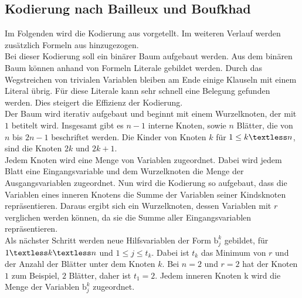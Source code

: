 \documentclass[a4,abstract=on]{scrartcl}
\begin{document}
	\subsection{Kodierung nach Bailleux und Boufkhad}
Im Folgenden wird die Kodierung aus \cite[][]{bailleux} vorgetellt. Im weiteren Verlauf werden zusätzlich Formeln aus \cite[][]{knuth} hinzugezogen.\\
Bei dieser Kodierung soll ein binärer Baum aufgebaut werden. Aus dem binären Baum können anhand von Formeln Literale gebildet werden. Durch das Wegstreichen von trivialen Variablen bleiben am Ende einige Klauseln mit einem Literal übrig. Für diese Literale kann sehr schnell eine Belegung gefunden werden. Dies steigert die Effizienz der Kodierung.\\
Der Baum wird iterativ aufgebaut und beginnt mit einem Wurzelknoten, der mit $1$ betitelt wird. Insgesamt gibt es $n-1$ interne Knoten, sowie $n$ Blätter, die von $n$ bis $2n-1$ beschriftet werden. Die Kinder von Knoten $k$  für $1 \leq k \textless n$, sind die Knoten $2k$ und $2k +1$.\\
Jedem Knoten wird eine Menge von Variablen zugeordnet. Dabei wird jedem Blatt eine Eingangsvariable und dem Wurzelknoten die Menge der Ausgangsvariablen zugeordnet. Nun wird die Kodierung so aufgebaut, dass die Variablen eines inneren Knotens die Summe der Variablen seiner Kindsknoten repräsentieren. Daraus ergibt sich ein Wurzelknoten, dessen Variablen mit $r$ verglichen werden können, da sie die Summe aller Eingangsvariablen repräsentieren.\\
Als nächster Schritt werden neue Hilfsvariablen der Form $\text{b}_j^k$ gebildet, für $1 \textless k \textless n$ und  $1 \leq j \leq t_k$. Dabei ist $t_k$ das Minimum von $r$ und der Anzahl der Blätter unter dem Knoten $k$. Bei $n=2$ und $r=2$ hat der Knoten $1$ zum Beispiel, $2$ Blätter, daher ist $t_1=2$. Jedem inneren Knoten k wird die Menge der Variablen $\text{b}_j^k$ zugeordnet.\\
\end{document}
